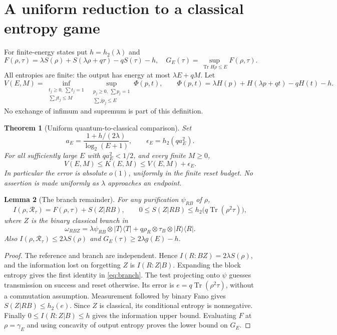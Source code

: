 \documentclass[11pt]{article}
\newtheorem{theorem}{Theorem}[section]
\newtheorem{lemma}[theorem]{Lemma}
\DeclareMathOperator{\Tr}{Tr}
\newcommand{\R}{\mathcal R}
\newcommand{\gE}{\gamma_E}
\newcommand{\hbin}{h_2}
\begin{document}
\section{A uniform reduction to a classical entropy game}
For finite-energy states put $h=\hbin(\lambda)$ and
\begin{equation}\label{eq:functional}
 F(\rho,\tau)=\lambda S(\rho)+S(\lambda\rho+q\tau)-qS(\tau)-h,
 \quad G_E(\tau)=\sup_{\Tr H\rho\le E}F(\rho,\tau).
\end{equation}
All entropies are finite: the output has energy at most $\lambda E+qM$. Let
\begin{equation}\label{eq:game}
 V(E,M)=\inf_{\substack{t_j\ge0,\ \sum t_j=1\\\sum jt_j\le M}}
 \ \sup_{\substack{p_j\ge0,\ \sum p_j=1\\\sum jp_j\le E}}
 \Phi(p,t),\qquad
 \Phi(p,t)=\lambda H(p)+H(\lambda p+qt)-qH(t)-h.
\end{equation}
No exchange of infimum and supremum is part of this definition.

\begin{theorem}[Uniform quantum-to-classical comparison]\label{thm:reduction}
Set
\[
 a_E=\frac{1+h/(2\lambda)}{\log_2(E+1)},\qquad
 \epsilon_E=\hbin(qa_E^2).
\]
For all sufficiently large $E$ with $qa_E^2<1/2$, and every finite $M\ge0$,
\begin{equation}\label{eq:sandwich}
 V(E,M)\le K(E,M)\le V(E,M)+\epsilon_E.
\end{equation}
In particular the error is absolute $o(1)$, uniformly in the finite reset budget. No assertion is made uniformly as $\lambda$ approaches an endpoint.
\end{theorem}

\begin{lemma}[The branch remainder]\label{lem:branch}
For any purification $\psi_{RB}$ of $\rho$,
\begin{equation}\label{eq:branch}
 I(\rho,\R_\tau)=F(\rho,\tau)+S(Z|RB),\qquad
 0\le S(Z|RB)\le\hbin\bigl(q\Tr(\rho^2\tau)\bigr),
\end{equation}
where $Z$ is the binary classical branch in
\[
 \omega_{RBZ}=\lambda\psi_{RB}\otimes|T\rangle\langle T|
       +q\rho_R\otimes\tau_B\otimes|R\rangle\langle R|.
\]
Also $I(\rho,\R_\tau)\le2\lambda S(\rho)$ and $G_E(\tau)\ge2\lambda g(E)-h$.
\end{lemma}
\begin{proof}
The reference and branch are independent. Hence $I(R:BZ)=2\lambda S(\rho)$, and the information lost on forgetting $Z$ is $I(R:Z|B)$. Expanding the block entropy gives the first identity in \eqref{eq:branch}. The test projecting onto $\psi$ guesses transmission on success and reset otherwise. Its error is $e=q\Tr(\rho^2\tau)$, without a commutation assumption. Measurement followed by binary Fano gives $S(Z|RB)\le\hbin(e)$. Since $Z$ is classical, its conditional entropy is nonnegative. Finally $0\le I(R:Z|B)\le h$ gives the information upper bound. Evaluating $F$ at $\rho=\gE$ and using concavity of output entropy proves the lower bound on $G_E$.
\end{proof}
\end{document}
